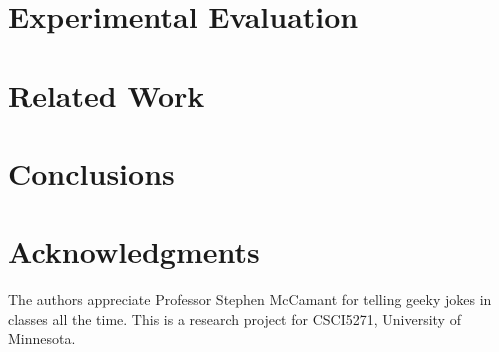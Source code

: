 \documentclass{sig-alternate-05-2015}
\begin{document}
\section{Experimental Evaluation}


\section{Related Work}


\section{Conclusions}



\section{Acknowledgments}
The authors appreciate Professor Stephen McCamant for telling geeky jokes in classes all the time.
This is a research project for CSCI5271, University of Minnesota.


 
\end{document}

